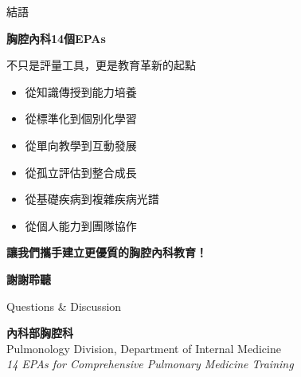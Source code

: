 \documentclass[aspectratio=169]{beamer}
\begin{document}
\begin{frame}{結語}
\begin{center}
\Large{\textcolor{emergency_red}{\textbf{胸腔內科14個EPAs}}}
\end{center}

\vspace{0.5cm}

\begin{center}
\large{不只是評量工具，更是教育革新的起點}
\end{center}

\vspace{1cm}

\begin{itemize}
\item 從知識傳授到能力培養
\item 從標準化到個別化學習
\item 從單向教學到互動發展
\item 從孤立評估到整合成長
\item \textcolor{emergency_red}{從基礎疾病到複雜疾病光譜}
\item \textcolor{emergency_red}{從個人能力到團隊協作}
\end{itemize}

\vspace{1cm}

\begin{center}
\textbf{\textcolor{emergency_blue}{讓我們攜手建立更優質的胸腔內科教育！}}
\end{center}
\end{frame}

\begin{frame}[plain]
\begin{center}
\Huge{\textcolor{emergency_blue}{\textbf{謝謝聆聽}}}

\vspace{1cm}

\Large{\textcolor{emergency_gray}{Questions \& Discussion}}

\vspace{1cm}

\textcolor{emergency_red}{\textbf{內科部胸腔科}}\\
\textcolor{emergency_blue}{Pulmonology Division, Department of Internal Medicine}\\
\vspace{0.5cm}
\textcolor{emergency_gray}{\textit{14 EPAs for Comprehensive Pulmonary Medicine Training}}
\end{center}
\end{frame}
\end{document}
